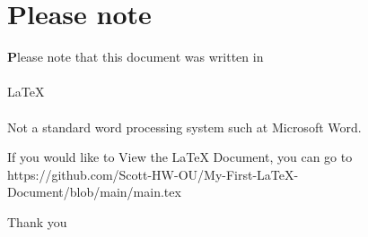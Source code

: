 \documentclass[12pt,a4paper,landscape]{article}
\begin{document}
\section{Please note}

\textbf 
Please note that this document was written in
\\
\\
\LaTeX{} \\
\\
Not a standard word processing system such at Microsoft Word. 

If you would like to View the \LaTeX{} Document, you can go to https://github.com/Scott-HW-OU/My-First-LaTeX-Document/blob/main/main.tex

Thank you 
\end{document}
